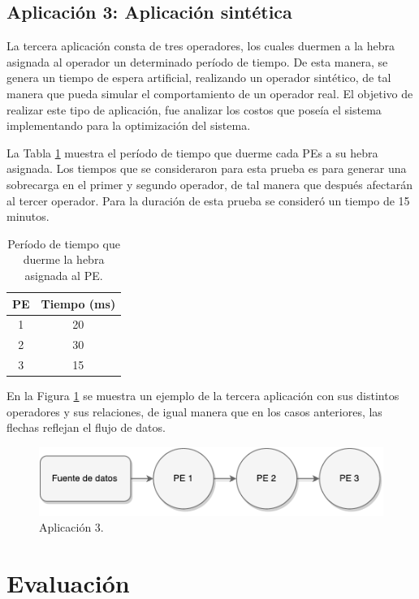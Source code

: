 \subsection{Aplicación 3: Aplicación sintética}
La tercera aplicación consta de tres operadores, los cuales duermen a la hebra asignada al operador un determinado período de tiempo. De esta manera, se genera un tiempo de espera artificial, realizando un operador sintético, de tal manera que pueda simular el comportamiento de un operador real. El objetivo de realizar este tipo de aplicación, fue analizar los costos que poseía el sistema implementando para la optimización del sistema.

La Tabla \ref{tab:app3-time} muestra el período de tiempo que duerme cada PEs a su hebra asignada. Los tiempos que se consideraron para esta prueba es para generar una sobrecarga en el primer y segundo operador, de tal manera que después afectarán al tercer operador. Para la duración de esta prueba se consideró un tiempo de 15 minutos.

\begin{table}[!ht]
\centering
\caption{Período de tiempo que duerme la hebra asignada al PE.}
\begin{tabular}{| c | c |}
\hline
PE & Tiempo (ms) \\ \hline
1 & 20 \\
2 & 30 \\
3 & 15 \\\hline
\end{tabular}
\label{tab:app3-time}
\end{table}

En la Figura \ref{fig:terceraAplicacion} se muestra un ejemplo de la tercera aplicación con sus distintos operadores y sus relaciones, de igual manera que en los casos anteriores, las flechas reflejan el flujo de datos.

\begin{figure}[!hb]
	\centering
		\includegraphics[scale=0.75]{images/App3.pdf}
	\caption{Aplicación 3.}
	\label{fig:terceraAplicacion}
\end{figure}

\section{Evaluación}

